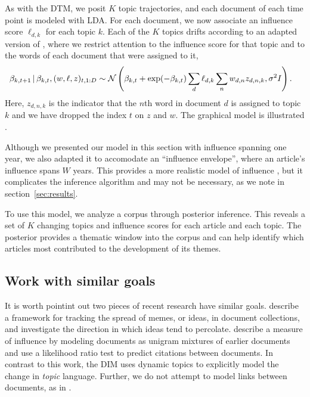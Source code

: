 As with the DTM, we posit $K$ topic trajectories, and each document of
each time point is modeled with LDA.  For each document, we now
associate an influence score $\ell_{d,k}$ for each topic $k$.  Each of
the $K$ topics drifts according to an adapted version of
, where we restrict attention to the influence
score for that topic and to the words of each document that were
assigned to it,
\begin{equation}
  \begin{split}
    \label{eq:logistic-normal-influence-topics}
    \beta_{k,t+1} & \, | \, \beta_{k,t}, (w, \ell, z)_{t,1:D} \sim
    \mathcal{N}\left(
      \beta_{k,t} +
      \exp(-\beta_{k,t}) \sum_{d} \ell_{d,k} \sum_n w_{d,n} z_{d,n,k},
      \sigma^2 I
    \right).
  \end{split}
\end{equation}
Here, $z_{d,n,k}$ is the indicator that the $n$th word in document $d$
is assigned to topic $k$ and we have dropped the index $t$ on $z$ and
$w$.  The graphical model is illustrated .

Although we presented our model in this section with influence
spanning one year, we also adapted it to accomodate an ``influence
envelope'', where an article's influence spans $W$ years.  This
provides a more realistic model of influence \cite{porter:2005}, but
it complicates the inference algorithm and may not be necessary, as we
note in section~\ref{sec:results}.


To use this model, we analyze a corpus through posterior inference.
This reveals a set of $K$ changing topics and influence scores for
each article and each topic.  The posterior provides a thematic window
into the corpus and can help identify which articles most contributed
to the development of its themes.

\subsection*{Work with similar goals}

It is worth pointint out two pieces of recent research have similar
goals. \cite{leskovec:2009} describe a framework for tracking the
spread of memes, or ideas, in document collections, and investigate
the direction in which ideas tend to percolate.
\cite{shaparenko:2007} describe a measure of influence by
modeling documents as unigram mixtures of earlier documents and use a
likelihood ratio test to predict citations between documents. In
contrast to this work, the DIM uses dynamic topics to explicitly model
the change in \emph{topic} language.  Further, we do not attempt to
model links between documents, as in \cite{shaparenko:2007}.  %
